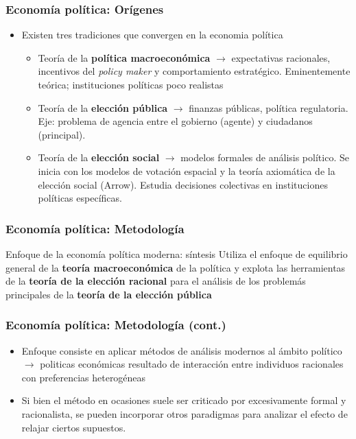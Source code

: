 \documentclass[14pt,aspectratio=169]{beamer}
\begin{document}
\begin{frame}
\frametitle{Economía política: Orígenes}
\begin{itemize}
  \item Existen tres tradiciones que convergen en la economia política
    \begin{itemize}
    \item Teoría de la \textbf{política macroeconómica} $\longrightarrow$ expectativas racionales, incentivos del \textit{policy maker} y comportamiento estratégico. Eminentemente teórica; instituciones políticas poco realistas
\item Teoría de la \textbf{elección pública} $\longrightarrow$ finanzas públicas, política regulatoria. Eje: problema de agencia entre el gobierno (agente) y ciudadanos (principal). 
\item Teoría de la \textbf{elección social} $\longrightarrow$ modelos formales de análisis político. Se inicia con los modelos de votación espacial y la teoría axiomática de la elección social (Arrow). Estudia decisiones colectivas en instituciones políticas específicas.
\end{itemize}
\end{itemize}
\end{frame}


\begin{frame}\frametitle{Economía política: Metodología}
\begin{block}{Enfoque de la economía política moderna: síntesis}
Utiliza el enfoque de equilibrio general de la \textbf{teoría macroeconómica}
de la política y explota las herramientas de la \textbf{teoría de la elección
racional} para el análisis de los problemás principales de la \textbf{teoría
de la elección pública}
\end{block}
\end{frame}


\begin{frame}\frametitle{Economía política: Metodología (cont.)}
  \begin{itemize}
    \item Enfoque consiste en aplicar métodos de análisis modernos al
      ámbito político $\longrightarrow$ politicas económicas resultado
      de interacción entre individuos racionales con preferencias
      heterogéneas
      \item Si bien el método en ocasiones suele ser criticado por
        excesivamente formal y racionalista, se pueden incorporar
        otros paradigmas para analizar el efecto de relajar ciertos supuestos.
\end{itemize}
\end{frame}
\end{document}

